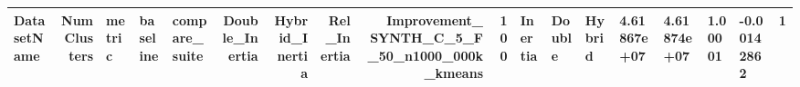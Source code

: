\begin{tabular}{lrlllrrrrr}
\toprule
DatasetName & NumClusters & metric & baseline & compare_suite & Double_Inertia & Hybrid_Inertia & Rel_Inertia & Improvement_%
\midrule
SYNTH_C_5_F_50_n1000_000k_kmeans & 100 & Inertia & Double & Hybrid & 4.61867e+07 & 4.61874e+07 & 1.00001 & -0.00142862 & 1 \\
\bottomrule
\end{tabular}
